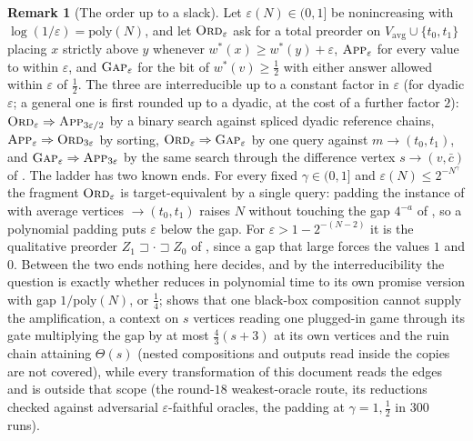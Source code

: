 \documentclass[11pt]{article}
\theoremstyle{plain}
\theoremstyle{definition}
\newtheorem{remark}[theorem]{Remark}
\newcommand{\Vavg}{V_{\mathrm{avg}}}
\begin{document}
\begin{remark}[The order up to a slack]\label{rem:eps-ladder}
Let $\varepsilon(N)\in(0,1]$ be nonincreasing with
$\log(1/\varepsilon)=\mathrm{poly}(N)$, and let $\textsc{Ord}_\varepsilon$
ask for a total preorder on $\Vavg\cup\{t_0,t_1\}$ placing $x$ strictly
above $y$ whenever $w^\ast(x)\ge w^\ast(y)+\varepsilon$,
$\textsc{App}_\varepsilon$ for every value to within $\varepsilon$, and
$\textsc{Gap}_\varepsilon$ for the bit of $w^\ast(v)\ge\tfrac12$ with
either answer allowed within $\varepsilon$ of $\tfrac12$. The three are
interreducible up to a constant factor in $\varepsilon$ (for dyadic
$\varepsilon$; a general one is first rounded up to a dyadic, at the cost
of a further factor $2$):
$\textsc{Ord}_\varepsilon\Rightarrow\textsc{App}_{3\varepsilon/2}$ by a
binary search against spliced dyadic reference chains,
$\textsc{App}_\varepsilon\Rightarrow\textsc{Ord}_{3\varepsilon}$ by
sorting, $\textsc{Ord}_\varepsilon\Rightarrow\textsc{Gap}_\varepsilon$ by
one query against $m\to(t_0,t_1)$, and
$\textsc{Gap}_\varepsilon\Rightarrow\textsc{App}_{3\varepsilon}$ by the
same search through the difference vertex $s\to(v,\bar c)$ of
. The ladder has two known ends. For every fixed
$\gamma\in(0,1]$ and $\varepsilon(N)\le2^{-N^{\gamma}}$ the fragment
$\textsc{Ord}_\varepsilon$ is target-equivalent by a single query: padding
the instance of  with average vertices
$\to(t_0,t_1)$ raises $N$ without touching the gap $4^{-a}$ of
, so a polynomial padding puts $\varepsilon$
below the gap. For $\varepsilon>1-2^{-(N-2)}$ it is the qualitative
preorder $Z_1\sqsupset\cdot\sqsupset Z_0$ of ,
since a gap that large forces the values $1$ and $0$. Between the two
ends nothing here decides, and by the interreducibility the question is
exactly whether  reduces in polynomial time to its own
promise version with gap $1/\mathrm{poly}(N)$, or $\tfrac14$;
 shows that one black-box composition cannot
supply the amplification, a context on $s$ vertices reading one plugged-in
game through its gate multiplying the gap by at most $\tfrac43(s+3)$ at
its own vertices and the ruin chain attaining $\Theta(s)$ (nested
compositions and outputs read inside the copies are not covered), while
every transformation of this document reads the edges and is outside that
scope (the round-$18$ weakest-oracle route, its reductions checked
against adversarial $\varepsilon$-faithful oracles, the padding at
$\gamma=1,\tfrac12$ in $300$ runs).
\end{remark}
\end{document}
